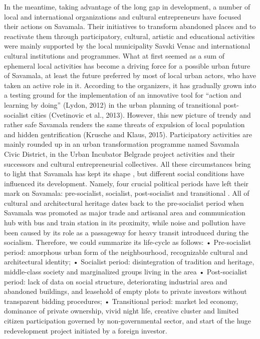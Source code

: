 \documentclass[11pt]{report}
\begin{document}
In the meantime, taking advantage of the long gap in development, a number of local and international organizations and cultural entrepreneurs have focused their actions on Savamala. Their initiatives to transform abandoned places and to reactivate them through participatory, cultural, artistic and educational activities were mainly supported by the local municipality Savski Venac and international cultural institutions and programmes. What at first seemed as a sum of ephemeral local activities has become a driving force for a possible urban future of Savamala, at least the future preferred by most of local urban actors, who have taken an active role in it. According to the organizers, it has gradually grown into a testing ground for the implementation of an innovative tool for “action and learning by doing” (Lydon, 2012) in the urban planning of transitional post-socialist cities (Cvetinovic et al., 2013). However, this new picture of trendy and rather safe Savamala renders the same threats of expulsion of local population and hidden gentrification (Krusche and Klaus, 2015). Participatory activities are mainly rounded up in an urban transformation programme named Savamala Civic District, in the Urban Incubator Belgrade project activities and their successors and cultural entrepreneurial collectives.
All these circumstances bring to light that Savamala has kept its shape , but different social conditions have influenced its development. Namely, four crucial political periods have left their mark on Savamala: pre-socialist, socialist, post-socialist and transitional . All of cultural and architectural heritage dates back to the pre-socialist period when Savamala was promoted as major trade and artisanal area and communication hub with bus and train station in its proximity, while noise and pollution have been caused by its role as a passageway for heavy transit introduced during the socialism. Therefore, we could summarize its life-cycle as follows:
•	Pre-socialist period: amorphous urban form of the neighbourhood, recognizable cultural and architectural identity; 
•	Socialist period: disintegration of tradition and heritage, middle-class society and marginalized groups living in the area
•	Post-socialist period: lack of data on social structure, deteriorating industrial area and abandoned buildings, and leasehold of empty plots to private investors without transparent bidding procedures;
•	Transitional period: market led economy, dominance of private ownership, vivid night life, creative cluster and limited citizen participation governed by non-governmental sector, and start of the huge redevelopment project initiated by a foreign  investor.
\end{document}
